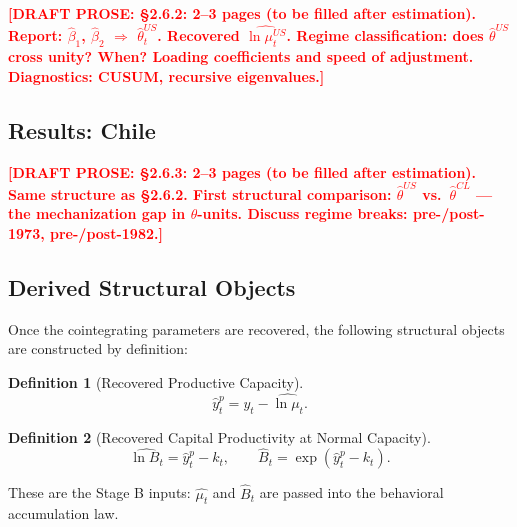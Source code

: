 \documentclass[12pt,letterpaper]{article}
\newcommand{\mut}{\mu_t}           %
\newcommand{\Bt}{B_t}              %
\newcommand{\draftnote}[1]{%
  \textcolor{red}{\textbf{[DRAFT PROSE: #1]}}}
\newtheorem{definition}{Definition}[section]
\begin{document}
\draftnote{§2.6.2: 2--3 pages (to be filled after estimation).
  Report: $\hat{\beta}_1$, $\hat{\beta}_2$ $\Rightarrow$ $\hat{\theta}_t^{US}$.
  Recovered $\widehat{\ln\mut^{US}}$. Regime classification: does $\hat{\theta}^{US}$
  cross unity? When? Loading coefficients and speed of adjustment.
  Diagnostics: CUSUM, recursive eigenvalues.}


\subsection{Results: Chile}
\label{sec:stageA_chile}

\draftnote{§2.6.3: 2--3 pages (to be filled after estimation).
  Same structure as §2.6.2. First structural comparison:
  $\hat{\theta}^{US}$ vs.\ $\hat{\theta}^{CL}$ — the mechanization gap in
  $\theta$-units. Discuss regime breaks: pre-/post-1973, pre-/post-1982.}


\subsection{Derived Structural Objects}
\label{sec:stageA_derived}

Once the cointegrating parameters are recovered, the following structural
objects are constructed by definition:

\begin{definition}[Recovered Productive Capacity]
\label{def:yp}
\begin{equation}
  \hat{y}^p_t = y_t - \widehat{\ln\mut}.
  \label{eq:yp_hat}
\end{equation}
\end{definition}

\begin{definition}[Recovered Capital Productivity at Normal Capacity]
\label{def:B}
\begin{equation}
  \widehat{\ln\Bt} = \hat{y}^p_t - k_t,
  \qquad
  \hat{B}_t = \exp\!\left(\hat{y}^p_t - k_t\right).
  \label{eq:B_hat}
\end{equation}
\end{definition}

These are the Stage B inputs: $\widehat{\mut}$ and $\hat{B}_t$ are
passed into the behavioral accumulation law.
\end{document}
